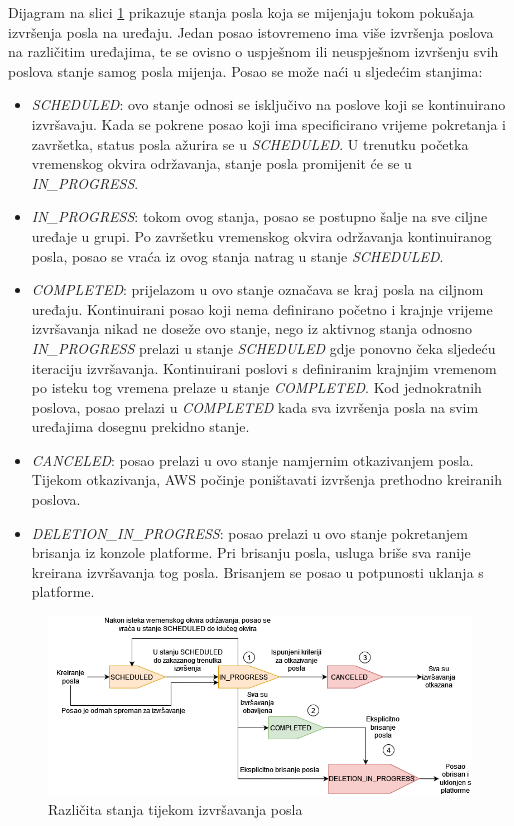 Dijagram na slici \ref{fig:job_states} prikazuje stanja posla koja se mijenjaju tokom pokušaja izvršenja posla na uređaju. Jedan posao istovremeno ima više izvršenja poslova na različitim uređajima, te se ovisno o uspješnom ili neuspješnom izvršenju svih poslova stanje samog posla mijenja. Posao se može naći u sljedećim stanjima:
\begin{itemize}
	\item \textit{SCHEDULED}: ovo stanje odnosi se isključivo na poslove koji se kontinuirano izvršavaju. Kada se pokrene posao koji ima specificirano vrijeme pokretanja i završetka, status posla ažurira se u \textit{SCHEDULED}. U trenutku početka vremenskog okvira održavanja, stanje posla promijenit će se u \textit{IN\_PROGRESS}.
	\item \textit{IN\_PROGRESS}: tokom ovog stanja, posao se postupno šalje na sve ciljne uređaje u grupi. Po završetku vremenskog okvira održavanja kontinuiranog posla, posao se vraća iz ovog stanja natrag u stanje \textit{SCHEDULED}.
	\item \textit{COMPLETED}: prijelazom u ovo stanje označava se kraj posla na ciljnom uređaju. Kontinuirani posao koji nema definirano početno i krajnje vrijeme izvršavanja nikad ne doseže ovo stanje, nego iz aktivnog stanja odnosno \textit{IN\_PROGRESS} prelazi u stanje \textit{SCHEDULED} gdje ponovno čeka sljedeću iteraciju izvršavanja. Kontinuirani poslovi s definiranim krajnjim vremenom po isteku tog vremena prelaze u stanje \textit{COMPLETED}. Kod jednokratnih poslova, posao prelazi u \textit{COMPLETED} kada sva izvršenja posla na svim uređajima dosegnu prekidno stanje. 
	\item \textit{CANCELED}: posao prelazi u ovo stanje namjernim otkazivanjem posla. Tijekom otkazivanja, AWS počinje poništavati izvršenja prethodno kreiranih poslova.
	\item \textit{DELETION\_IN\_PROGRESS}: posao prelazi u ovo stanje pokretanjem brisanja iz konzole platforme. Pri brisanju posla, usluga briše sva ranije kreirana izvršavanja tog posla. Brisanjem se posao u potpunosti uklanja s platforme. 
\end{itemize}

\begin{figure}[ht]
	\centering
	\includegraphics[scale=0.5]{imgs/job_states}
	\caption{Različita stanja tijekom izvršavanja posla \cite{aws_docs}}
	\label{fig:job_states}
\end{figure}

